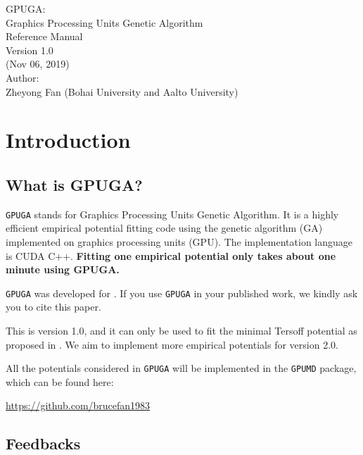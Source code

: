 \documentclass[12pt,a4paper]{report}
\begin{document}
\begin{center}
  \huge
  {
   \vspace*{1.0cm}
   GPUGA: \\
   Graphics Processing Units Genetic Algorithm \\
   \vspace*{1.0cm}
   Reference Manual\\
   \vspace*{1.0cm}
   Version 1.0 \\
   \vspace*{1.0cm}
   (Nov 06, 2019)\\
  \vspace*{2.0cm}
  }
  \large
  {
  Author: \\
  Zheyong Fan (Bohai University and Aalto University)\\
  }
  \vspace*{1.0cm}
\end{center}

\tableofcontents

\chapter{Introduction\label{chapter:introduction}}

\section{What is GPUGA?}

\verb"GPUGA" stands for Graphics Processing Units Genetic Algorithm. It is a highly efficient empirical potential fitting code using the genetic algorithm (GA) implemented on graphics processing units (GPU). The implementation language is CUDA C++. \textbf{Fitting one empirical potential only takes about one minute using GPUGA. }

\verb"GPUGA" was developed for \cite{fan2019arxiv}. If you use \verb"GPUGA" in your published work, we kindly ask you to cite this paper.

This is version 1.0, and it can only be used to fit the minimal Tersoff potential as proposed in \cite{fan2019arxiv}. We aim to implement more empirical potentials for version 2.0.

All the potentials considered in \verb"GPUGA" will be implemented in the \verb"GPUMD" package, which can be found here:

\url{https://github.com/brucefan1983}


\section{Feedbacks}
\end{document}
